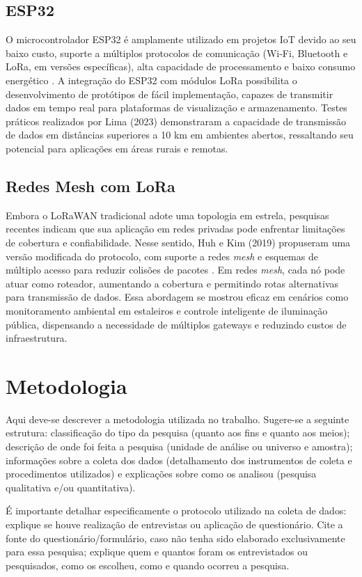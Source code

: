 \documentclass[
article,			%
11pt,				%
twoside,			%
a4paper,			%
section=TITLE,		%
onecolumn,          %
english,			%
brazil,				%
sumario=tradicional
]{abntex2}
\begin{document}
\subsection{ESP32}
O microcontrolador ESP32 é amplamente utilizado em projetos IoT devido ao seu baixo custo, suporte a múltiplos protocolos de comunicação (Wi-Fi, Bluetooth e LoRa, em versões específicas), alta capacidade de processamento e baixo consumo energético \cite{lima2023}. A integração do ESP32 com módulos LoRa possibilita o desenvolvimento de protótipos de fácil implementação, capazes de transmitir dados em tempo real para plataformas de visualização e armazenamento. Testes práticos realizados por Lima (2023) demonstraram a capacidade de transmissão de dados em distâncias superiores a 10 km em ambientes abertos, ressaltando seu potencial para aplicações em áreas rurais e remotas.

\subsection{Redes Mesh com LoRa}
Embora o LoRaWAN tradicional adote uma topologia em estrela, pesquisas recentes indicam que sua aplicação em redes privadas pode enfrentar limitações de cobertura e confiabilidade. Nesse sentido, Huh e Kim (2019) propuseram uma versão modificada do protocolo, com suporte a redes \textit{mesh} e esquemas de múltiplo acesso para reduzir colisões de pacotes \cite{huh2019}. Em redes \textit{mesh}, cada nó pode atuar como roteador, aumentando a cobertura e permitindo rotas alternativas para transmissão de dados. Essa abordagem se mostrou eficaz em cenários como monitoramento ambiental em estaleiros e controle inteligente de iluminação pública, dispensando a necessidade de múltiplos gateways e reduzindo custos de infraestrutura.
\section{Metodologia}
    
Aqui deve-se descrever a metodologia utilizada no trabalho. Sugere-se a seguinte estrutura: classificação do tipo da pesquisa (quanto aos fins e quanto aos meios); descrição de onde foi feita a pesquisa (unidade de análise ou universo e amostra); informações sobre a coleta dos dados (detalhamento dos instrumentos de coleta e procedimentos utilizados) e explicações sobre como os analisou (pesquisa qualitativa e/ou quantitativa).

É importante detalhar especificamente o protocolo utilizado na coleta de dados: explique se houve realização de entrevistas ou aplicação de questionário. Cite a fonte do questionário/formulário, caso não tenha sido elaborado exclusivamente para essa pesquisa; explique quem e quantos foram os entrevistados ou pesquisados, como os escolheu, como e quando ocorreu a pesquisa. 
\end{document}
